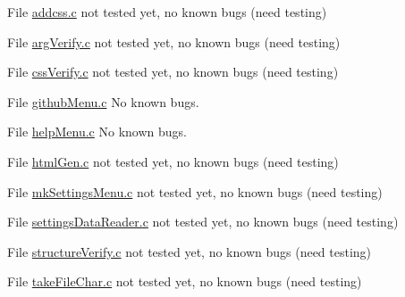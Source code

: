 
\begin{DoxyRefList}
\item[File \mbox{\hyperlink{addcss_8c}{addcss.c}} ]\label{bug__bug000001}%
%
not tested yet, no known bugs (need testing)  
\item[File \mbox{\hyperlink{argVerify_8c}{arg\+Verify.c}} ]\label{bug__bug000002}%
%
not tested yet, no known bugs (need testing)  
\item[File \mbox{\hyperlink{cssVerify_8c}{css\+Verify.c}} ]\label{bug__bug000003}%
%
not tested yet, no known bugs (need testing)  
\item[File \mbox{\hyperlink{githubMenu_8c}{github\+Menu.c}} ]\label{bug__bug000004}%
%
No known bugs.  
\item[File \mbox{\hyperlink{helpMenu_8c}{help\+Menu.c}} ]\label{bug__bug000005}%
%
No known bugs.  
\item[File \mbox{\hyperlink{htmlGen_8c}{html\+Gen.c}} ]\label{bug__bug000006}%
%
not tested yet, no known bugs (need testing) 
\item[File \mbox{\hyperlink{mkSettingsMenu_8c}{mk\+Settings\+Menu.c}} ]\label{bug__bug000007}%
%
not tested yet, no known bugs (need testing)  
\item[File \mbox{\hyperlink{settingsDataReader_8c}{settings\+Data\+Reader.c}} ]\label{bug__bug000008}%
%
not tested yet, no known bugs (need testing)  
\item[File \mbox{\hyperlink{structureVerify_8c}{structure\+Verify.c}} ]\label{bug__bug000009}%
%
not tested yet, no known bugs (need testing)  
\item[File \mbox{\hyperlink{takeFileChar_8c}{take\+File\+Char.c}} ]\label{bug__bug000010}%
%
not tested yet, no known bugs (need testing) 
\end{DoxyRefList}